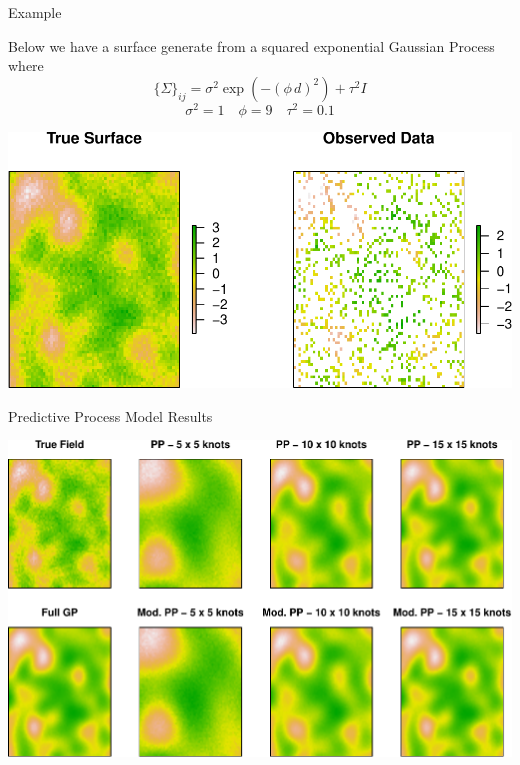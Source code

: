 \documentclass[11pt,ignorenonframetext,]{beamer}
\begin{document}
\begin{frame}{Example}
\protect\hypertarget{example-1}{}

Below we have a surface generate from a squared exponential Gaussian
Process where
\[ \{\Sigma\}_{ij} = \sigma^2 \exp\left(-(\phi\,d)^2\right) + \tau^2 I \]
\[ \sigma^2 = 1 \quad \phi=9 \quad \tau^2 = 0.1 \]

\begin{center}\includegraphics[width=\textwidth]{Lec21_files/figure-beamer/unnamed-chunk-12-1} \end{center}

\end{frame}

\begin{frame}{Predictive Process Model Results}
\protect\hypertarget{predictive-process-model-results}{}

\begin{center}\includegraphics[width=\textwidth]{Lec21_files/figure-beamer/unnamed-chunk-15-1} \end{center}

\end{frame}
\end{document}
